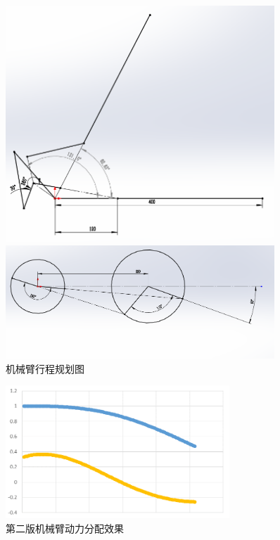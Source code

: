 \begin{figure}[ht]
\begin{minipage}[t]{0.35\textwidth}
    \centering
    \includegraphics[width = 0.9\textwidth]{images/arm_6.png}
\end{minipage}
\begin{minipage}[t]{0.65\textwidth}
    \centering
    \includegraphics[width = 0.9\textwidth]{images/arm_7.png}
\end{minipage}
\caption{机械臂行程规划图}
\label{fig:arm6}
\end{figure}

\begin{figure}[H]
    \centering
    \includegraphics[width = 0.75\textwidth]{images/arm_8.png}
    \caption{第二版机械臂动力分配效果}
    \label{fig:arm7}
\end{figure}

